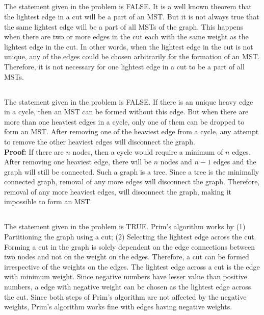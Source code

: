 \documentclass{article}
\begin{document}
\subsection{}
The statement given in the problem is FALSE. It is a well known theorem that the lightest edge in a cut will be a part of an MST. But it is not always true that the same lightest edge will be a part of all MSTs of the graph. This happens when there are two or more edges in the cut each with the same weight as the lightest edge in the cut. In other words, when the lightest edge in the cut is not unique, any of the edges could be chosen arbitrarily for the formation of an MST. Therefore, it is not necessary for one lightest edge in a cut to be a part of all MSTs.


\subsection{}
The statement given in the problem is FALSE. If there is an unique heavy edge in a cycle, then an MST can be formed without this edge. But when there are more than one heaviest edges in a cycle, only one of them can be dropped to form an MST. After removing one of the heaviest edge from a cycle, any attempt to remove the other heaviest edges will disconnect the graph. \\
\textbf{Proof:} If there are $n$ nodes, then a cycle would require a minimum of $n$ edges. After removing one heaviest edge, there will be $n$ nodes and $n-1$ edges and the graph will still be connected. Such a graph is a tree. Since a tree is the minimally connected graph, removal of any more edges will disconnect the graph. Therefore, removal of any more heaviest edges, will disconnect the graph, making it impossible to form an MST.

\subsection{}
The statement given in the problem is TRUE. Prim's algorithm works by (1) Partitioning the graph using a cut; (2) Selecting the lightest edge across the cut. Forming a cut in the graph is solely dependent on the edge connections between two nodes and not on the weight on the edges. Therefore, a cut can be formed irrespective of the weights on the edges. The lightest edge across a cut is the edge with minimum weight. Since negative numbers have lesser value than positive numbers, a edge with negative weight can be chosen as the lightest edge across the cut. Since both steps of Prim's algorithm are not affected by the negative weights, Prim's algorithm works fine with edges having negative weights.
\end{document}
